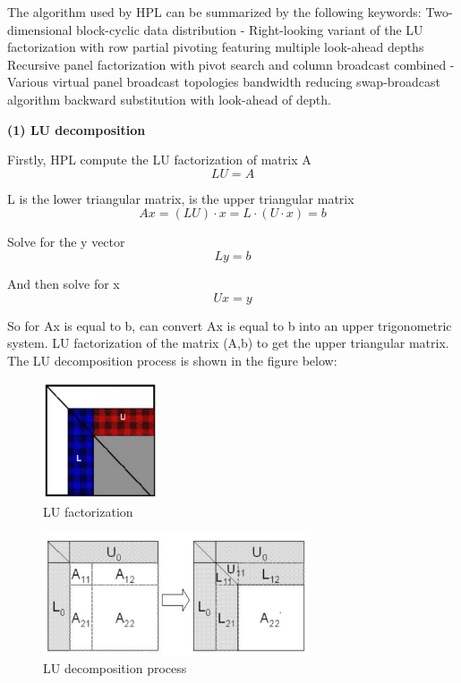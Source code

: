 \documentclass[a4paper,12pt]{article}
\begin{document}
The algorithm used by HPL can be summarized by the following keywords: Two-dimensional block-cyclic data distribution - Right-looking variant of the LU factorization with row partial pivoting featuring multiple look-ahead depths Recursive panel factorization with pivot search and column broadcast combined - Various virtual panel broadcast topologies bandwidth reducing swap-broadcast algorithm backward substitution with look-ahead of depth.

\textbf{(1) LU decomposition}

Firstly, HPL compute the LU factorization of matrix A
\begin{equation*}
LU=A
\end{equation*}

L is the lower triangular matrix, is the upper triangular matrix
\begin{equation*}
Ax=(LU) \cdot x=L \cdot (U \cdot x)=b
\end{equation*}

Solve for the y vector
\begin{equation*}
Ly=b
\end{equation*}

And then solve for x
\begin{equation*}
U x=y
\end{equation*}

So for Ax is equal to b, can convert Ax is equal to b into an upper trigonometric system. LU factorization of the matrix (A,b) to get the upper triangular matrix. The LU decomposition process is shown in the figure below:

\begin{figure}[H]
    \centering
    \includegraphics[width=0.3\textwidth]{LU_factorization.png}
    \caption{LU factorization}
    \label{fig:lu_factorization}
\end{figure}

\begin{figure}[H]
    \centering
    \includegraphics[width=0.7\textwidth]{LU_decomposition_process.png}
    \caption{LU decomposition process}
    \label{fig:lu_decomposition}
\end{figure}
\end{document}
